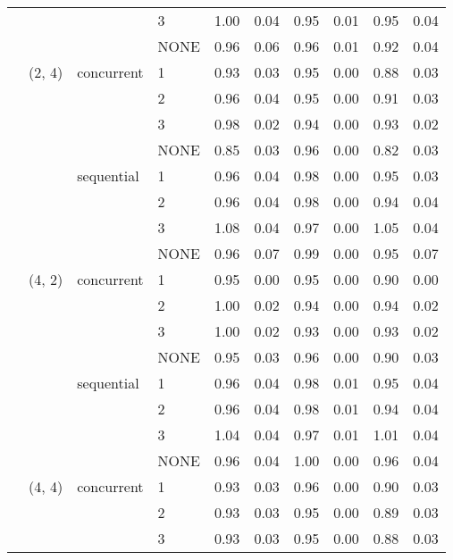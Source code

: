 \begin{tabular}{llllrrrrrr}
    &        &            & 3 &     1.00 & 0.04 &     0.95 & 0.01 &  0.95 & 0.04 \\
    &        &            & NONE &     0.96 & 0.06 &     0.96 & 0.01 &  0.92 & 0.04 \\
    & (2, 4) & concurrent & 1 &     0.93 & 0.03 &     0.95 & 0.00 &  0.88 & 0.03 \\
    &        &            & 2 &     0.96 & 0.04 &     0.95 & 0.00 &  0.91 & 0.03 \\
    &        &            & 3 &     0.98 & 0.02 &     0.94 & 0.00 &  0.93 & 0.02 \\
    &        &            & NONE &     0.85 & 0.03 &     0.96 & 0.00 &  0.82 & 0.03 \\
    &        & sequential & 1 &     0.96 & 0.04 &     0.98 & 0.00 &  0.95 & 0.03 \\
    &        &            & 2 &     0.96 & 0.04 &     0.98 & 0.00 &  0.94 & 0.04 \\
    &        &            & 3 &     1.08 & 0.04 &     0.97 & 0.00 &  1.05 & 0.04 \\
    &        &            & NONE &     0.96 & 0.07 &     0.99 & 0.00 &  0.95 & 0.07 \\
    & (4, 2) & concurrent & 1 &     0.95 & 0.00 &     0.95 & 0.00 &  0.90 & 0.00 \\
    &        &            & 2 &     1.00 & 0.02 &     0.94 & 0.00 &  0.94 & 0.02 \\
    &        &            & 3 &     1.00 & 0.02 &     0.93 & 0.00 &  0.93 & 0.02 \\
    &        &            & NONE &     0.95 & 0.03 &     0.96 & 0.00 &  0.90 & 0.03 \\
    &        & sequential & 1 &     0.96 & 0.04 &     0.98 & 0.01 &  0.95 & 0.04 \\
    &        &            & 2 &     0.96 & 0.04 &     0.98 & 0.01 &  0.94 & 0.04 \\
    &        &            & 3 &     1.04 & 0.04 &     0.97 & 0.01 &  1.01 & 0.04 \\
    &        &            & NONE &     0.96 & 0.04 &     1.00 & 0.00 &  0.96 & 0.04 \\
    & (4, 4) & concurrent & 1 &     0.93 & 0.03 &     0.96 & 0.00 &  0.90 & 0.03 \\
    &        &            & 2 &     0.93 & 0.03 &     0.95 & 0.00 &  0.89 & 0.03 \\
    &        &            & 3 &     0.93 & 0.03 &     0.95 & 0.00 &  0.88 & 0.03 \\

\end{tabular}
